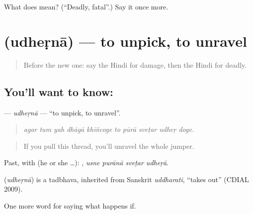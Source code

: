 \begin{tcolorbox}[breakable,colback=teal!4,colframe=teal!35!black,title={Before you move on}]
What does  mean? (\textquotedblleft{}Deadly, fatal\textquotedblright{}.) Say it once more.
\end{tcolorbox}
\section[\texorpdfstring{\hi{उधेड़ना} (udheṛnā)}{उधेड़ना (udheṛnā)}]{ (udheṛnā) — to unpick, to unravel}

\label{lesson:HI-C383-udherna}



\begin{quote}
Before the new one: say the Hindi for damage, then the Hindi for deadly.
\end{quote}

\subsection*{You'll want to know: }
\textbf{} — \emph{udheṛnā} — \textquotedblleft{}to unpick, to unravel\textquotedblright{}.

\begin{quote}
         
\end{quote}

\begin{quote}
\emph{agar tum yah dhāgā khīñcoge to pūrā sveṭar udheṛ doge.}
\end{quote}

\begin{quote}
If you pull this thread, you'll unravel the whole jumper.
\end{quote}

Past, with  (he or she …):    , \emph{usne purānā sveṭar udheṛā}.

\begin{cousinweb}
\textbf{} (\emph{udheṛnā}) is a tadbhava, inherited from Sanskrit \emph{uddharati}, \textquotedblleft{}takes out\textquotedblright{} (CDIAL 2009).
\end{cousinweb}

\begin{grammarlens}[title={What you've built}]
One more word for saying what happens if.
\end{grammarlens}

